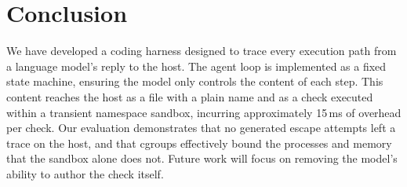 \documentclass[10pt,twocolumn,a4paper]{article}
\begin{document}
\section{Conclusion}

We have developed a coding harness designed to trace every execution path from a language model's reply to the host. The agent loop is implemented as a fixed state machine, ensuring the model only controls the content of each step. This content reaches the host as a file with a plain name and as a check executed within a transient namespace sandbox, incurring approximately 15\,ms of overhead per check. Our evaluation demonstrates that no generated escape attempts left a trace on the host, and that cgroups effectively bound the processes and memory that the sandbox alone does not. Future work will focus on removing the model's ability to author the check itself.



\end{document}
